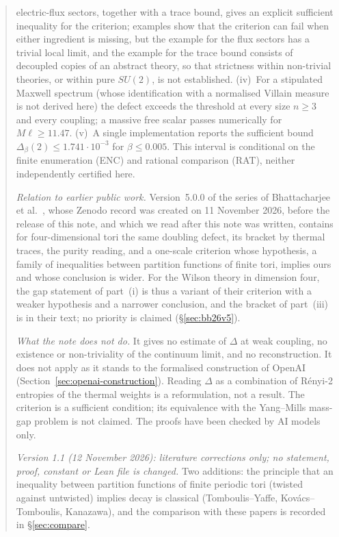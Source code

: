\documentclass[11pt,a4paper]{article}
\theoremstyle{plain}
\theoremstyle{definition}
\theoremstyle{remark}
\numberwithin{equation}{section}
\begin{document}
\begin{abstract}
electric-flux sectors, together with a trace bound, gives an explicit sufficient inequality for the criterion; examples show that the criterion can fail when either ingredient is missing, but the example for the flux sectors has a trivial local limit, and the example for the trace bound consists of decoupled copies of an abstract theory, so that strictness within non-trivial theories, or within pure $SU(2)$, is not established.
(iv)~For a stipulated Maxwell spectrum (whose identification with a normalised Villain measure is not derived here) the defect exceeds the
threshold at every size $n\ge3$ and every coupling; a massive free scalar passes numerically for $M\ell\ge11.47$.
(v)~A single implementation reports the sufficient bound $\Delta_\beta(2)\le1.741\cdot10^{-3}$ for $\beta\le0.005$. This interval is conditional on the finite enumeration (ENC) and rational comparison (RAT), neither independently certified here.

\emph{Relation to earlier public work.} Version~5.0.0 of the series of Bhattacharjee et al.\ \cite{BB26v5}, whose Zenodo record was
created on 11 November 2026, before the release of this note, and which we read after this note was written, contains for four-dimensional
tori the same doubling defect, its bracket by thermal traces, the purity reading, and a one-scale criterion whose hypothesis, a family of
inequalities between partition functions of finite tori, implies ours and whose conclusion is wider. For the Wilson theory in dimension four,
the gap statement of part~(i) is thus a variant of their criterion with a weaker hypothesis and a narrower conclusion, and the bracket of
part~(iii) is in their text; no priority is claimed (\S\ref{sec:bb26v5}).

\emph{What the note does not do.} It gives no estimate of $\Delta$ at weak coupling, no existence or non-triviality of the continuum limit,
and no reconstruction. It does not apply as it stands to the formalised construction of OpenAI (Section~\ref{sec:openai-construction}).
Reading $\Delta$ as a combination of R\'enyi-2 entropies of the thermal weights is a reformulation, not a result. The criterion is a sufficient
condition; its equivalence with the Yang--Mills mass-gap problem is not claimed. The proofs have been checked by AI models only.

\emph{Version 1.1 (12 November 2026): literature corrections only; no statement, proof, constant or Lean file is changed.} Two additions: the principle that an inequality between partition functions of finite periodic tori (twisted against untwisted) implies decay is classical (Tomboulis--Yaffe, Kov\'acs--Tomboulis, Kanazawa), and the comparison with these papers is recorded in \S\ref{sec:compare}.
\end{abstract}
\end{document}
